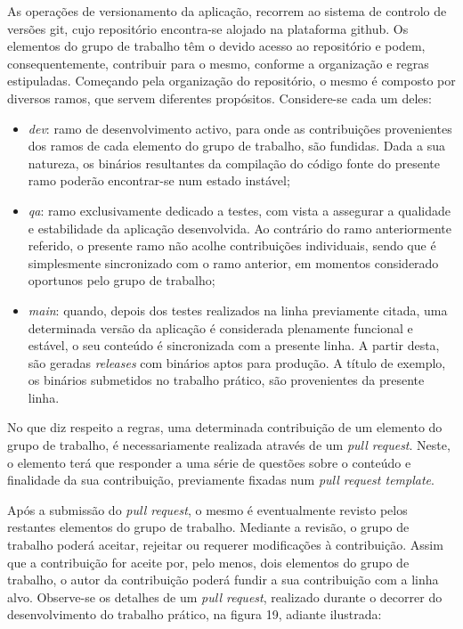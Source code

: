 \documentclass[12pt]{report}
\begin{document}
As operações de versionamento da aplicação, recorrem ao sistema de controlo de versões \gls{git}, cujo repositório encontra-se alojado na plataforma \gls{github}. Os elementos do grupo de trabalho têm o devido acesso ao repositório e podem, consequentemente, contribuir para o mesmo, conforme a organização e regras estipuladas. Começando pela organização do repositório, o mesmo é composto por diversos ramos, que servem diferentes propósitos. Considere-se cada um deles:

\begin{itemize}
    \item \emph{dev}: ramo de desenvolvimento activo, para onde as contribuições provenientes dos ramos de cada elemento do grupo de trabalho, são fundidas. Dada a sua natureza, os binários resultantes da compilação do código fonte do presente ramo poderão encontrar-se num estado instável;
    
    \item \emph{qa}: ramo exclusivamente dedicado a testes, com vista a assegurar a qualidade e estabilidade da aplicação desenvolvida. Ao contrário do ramo anteriormente referido, o presente ramo não acolhe contribuições individuais, sendo que é simplesmente sincronizado com o ramo anterior, em momentos considerado oportunos pelo grupo de trabalho;
    
    \item \emph{main}: quando, depois dos testes realizados na linha previamente citada, uma determinada versão da aplicação é considerada plenamente funcional e estável, o seu conteúdo é sincronizada com a presente linha. A partir desta, são geradas \textit{releases} com binários aptos para produção. A título de exemplo, os binários submetidos no trabalho prático, são provenientes da presente linha.
\end{itemize}

No que diz respeito a regras, uma determinada contribuição de um elemento do grupo de trabalho, é necessariamente realizada através de um \textit{pull request}. Neste, o elemento terá que responder a uma série de questões sobre o conteúdo e finalidade da sua contribuição, previamente fixadas num \textit{pull request template}. 

Após a submissão do \textit{pull request}, o mesmo é eventualmente revisto pelos restantes elementos do grupo de trabalho. Mediante a revisão, o grupo de trabalho poderá aceitar, rejeitar ou requerer modificações à contribuição. Assim que a contribuição for aceite por, pelo menos, dois elementos do grupo de trabalho, o autor da contribuição poderá fundir a sua contribuição com a linha alvo. Observe-se os detalhes de um \textit{pull request}, realizado durante o decorrer do desenvolvimento do trabalho prático, na figura 19, adiante ilustrada:
\end{document}
